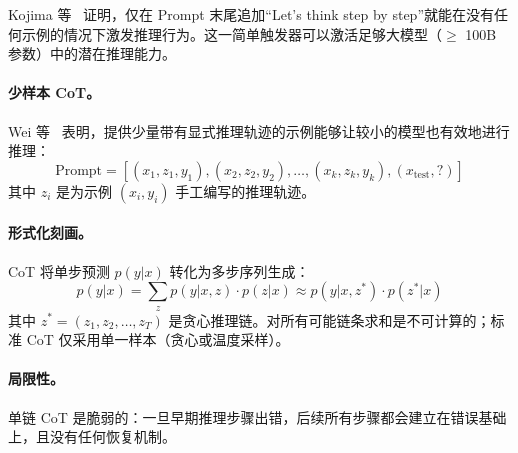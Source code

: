 Kojima 等~\cite{kojima2022large} 证明，仅在 Prompt 末尾追加“Let's think step by step”就能在没有任何示例的情况下激发推理行为。这一简单触发器可以激活足够大模型（$\geq$ 100B 参数）中的潜在推理能力。

\paragraph{少样本 CoT。}
\label{few-shot-cot.}

Wei 等~\cite{wei2022chain} 表明，提供少量带有显式推理轨迹的示例能够让较小的模型也有效地进行推理：
\begin{equation}
\text{Prompt} = [(x_1, z_1, y_1), (x_2, z_2, y_2), \ldots, (x_k, z_k, y_k), (x_{\text{test}}, \texttt{?})]
\end{equation}
其中 $z_i$ 是为示例 $(x_i, y_i)$ 手工编写的推理轨迹。

\paragraph{形式化刻画。}
\label{formal-characterization.}

CoT 将单步预测 $p(y|x)$ 转化为多步序列生成：
\begin{equation}
p(y|x) = \sum_{z} p(y|x, z) \cdot p(z|x) \approx p(y|x, z^*) \cdot p(z^*|x)
\end{equation}
其中 $z^* = (z_1, z_2, \ldots, z_T)$ 是贪心推理链。对所有可能链条求和是不可计算的；标准 CoT 仅采用单一样本（贪心或温度采样）。

\paragraph{局限性。}
\label{limitations.-dup2}

单链 CoT 是脆弱的：一旦早期推理步骤出错，后续所有步骤都会建立在错误基础上，且没有任何恢复机制。


